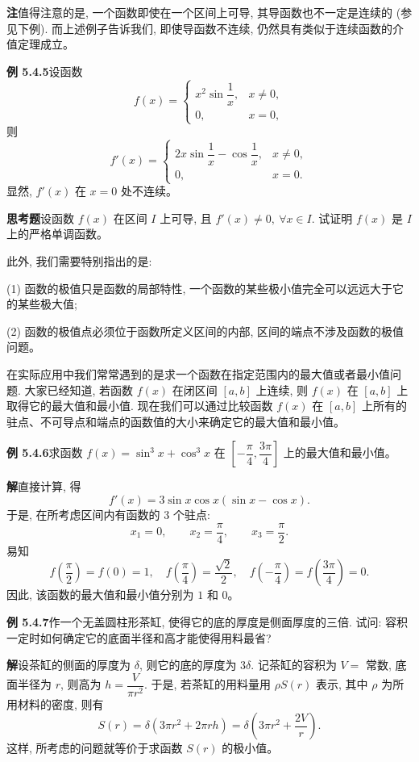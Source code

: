 \documentclass[UTF8,12pt,a4paper,fontset=fandol]{ctexart}
\begin{document}
\noindent\textbf{注}\quad 值得注意的是, 一个函数即使在一个区间上可导, 其导函数也不一定是连续的 (参见下例). 而上述例子告诉我们, 即使导函数不连续, 仍然具有类似于连续函数的介值定理成立。

\noindent\textbf{例 5.4.5}\quad 设函数
\[
  f(x)=
  \begin{cases}
    x^2\sin\dfrac1x, & x\ne0,\\
    0, & x=0,
  \end{cases}
\]
则
\[
  f'(x)=
  \begin{cases}
    2x\sin\dfrac1x-\cos\dfrac1x, & x\ne0,\\
    0, & x=0.
  \end{cases}
\]
显然, $f'(x)$ 在 $x=0$ 处不连续。

\noindent\textbf{思考题}\quad 设函数 $f(x)$ 在区间 $I$ 上可导, 且 $f'(x)\ne0,\ \forall x\in I$. 试证明 $f(x)$ 是 $I$ 上的严格单调函数。

此外, 我们需要特别指出的是:

(1) 函数的极值只是函数的局部特性, 一个函数的某些极小值完全可以远远大于它的某些极大值;

(2) 函数的极值点必须位于函数所定义区间的内部, 区间的端点不涉及函数的极值问题。

在实际应用中我们常常遇到的是求一个函数在指定范围内的最大值或者最小值问题. 大家已经知道, 若函数 $f(x)$ 在闭区间 $[a,b]$ 上连续, 则 $f(x)$ 在 $[a,b]$ 上取得它的最大值和最小值. 现在我们可以通过比较函数 $f(x)$ 在 $[a,b]$ 上所有的驻点、不可导点和端点的函数值的大小来确定它的最大值和最小值。

\noindent\textbf{例 5.4.6}\quad 求函数 $f(x)=\sin^3x+\cos^3x$ 在 $\left[-\dfrac\pi4,\dfrac{3\pi}4\right]$ 上的最大值和最小值。

\noindent\textbf{解}\quad 直接计算, 得
\[
  f'(x)=3\sin x\cos x(\sin x-\cos x).
\]
于是, 在所考虑区间内有函数的 $3$ 个驻点:
\[
  x_1=0,\qquad x_2=\frac\pi4,\qquad x_3=\frac\pi2.
\]
易知
\[
  f\left(\frac\pi2\right)=f(0)=1,\quad
  f\left(\frac\pi4\right)=\frac{\sqrt2}{2},\quad
  f\left(-\frac\pi4\right)=f\left(\frac{3\pi}4\right)=0.
\]
因此, 该函数的最大值和最小值分别为 $1$ 和 $0$。

\noindent\textbf{例 5.4.7}\quad 作一个无盖圆柱形茶缸, 使得它的底的厚度是侧面厚度的三倍. 试问: 容积一定时如何确定它的底面半径和高才能使得用料最省?

\noindent\textbf{解}\quad 设茶缸的侧面的厚度为 $\delta$, 则它的底的厚度为 $3\delta$. 记茶缸的容积为 $V=$ 常数, 底面半径为 $r$, 则高为 $h=\dfrac{V}{\pi r^2}$. 于是, 若茶缸的用料量用 $\rho S(r)$ 表示, 其中 $\rho$ 为所用材料的密度, 则有
\[
  S(r)=\delta(3\pi r^2+2\pi rh)
  =\delta\left(3\pi r^2+\frac{2V}{r}\right).
\]
这样, 所考虑的问题就等价于求函数 $S(r)$ 的极小值。
\end{document}
